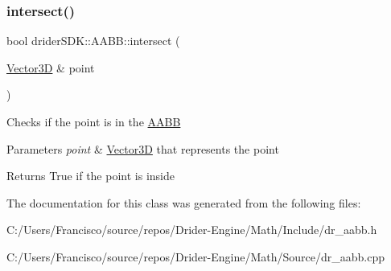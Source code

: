 \subsubsection{\texorpdfstring{intersect()}{intersect()}\hspace{0.1cm}{\footnotesize\ttfamily [6/6]}}
{\footnotesize\ttfamily bool drider\+S\+D\+K\+::\+A\+A\+B\+B\+::intersect (\begin{DoxyParamCaption}\item[{\hyperlink{classdrider_s_d_k_1_1_vector3_d}{Vector3D} \&}]{point }\end{DoxyParamCaption})}

Checks if the point is in the \hyperlink{classdrider_s_d_k_1_1_a_a_b_b}{A\+A\+BB}


\begin{DoxyParams}{Parameters}
{\em point} & \hyperlink{classdrider_s_d_k_1_1_vector3_d}{Vector3D} that represents the point\\
\hline
\end{DoxyParams}
\begin{DoxyReturn}{Returns}
True if the point is inside 
\end{DoxyReturn}


The documentation for this class was generated from the following files\+:\begin{DoxyCompactItemize}
\item 
C\+:/\+Users/\+Francisco/source/repos/\+Drider-\/\+Engine/\+Math/\+Include/dr\+\_\+aabb.\+h\item 
C\+:/\+Users/\+Francisco/source/repos/\+Drider-\/\+Engine/\+Math/\+Source/dr\+\_\+aabb.\+cpp\end{DoxyCompactItemize}
